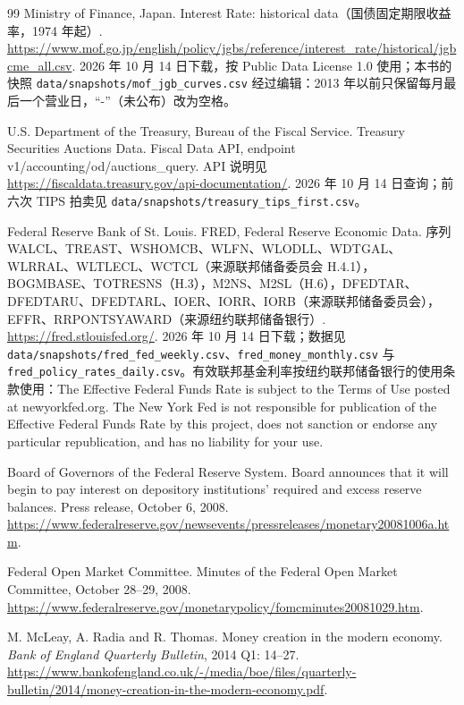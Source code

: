 \begin{thebibliography}{99}
 Ministry of Finance, Japan. Interest Rate: historical data（国债固定期限收益率，1974 年起）. \url{https://www.mof.go.jp/english/policy/jgbs/reference/interest_rate/historical/jgbcme_all.csv}. 2026 年 10 月 14 日下载，按 Public Data License 1.0 使用；本书的快照 \texttt{data/snapshots/mof\_jgb\_curves.csv} 经过编辑：2013 年以前只保留每月最后一个营业日，“-”（未公布）改为空格。

 U.S. Department of the Treasury, Bureau of the Fiscal Service. Treasury Securities Auctions Data. Fiscal Data API, endpoint v1/accounting/od/auctions\_query. API 说明见 \url{https://fiscaldata.treasury.gov/api-documentation/}. 2026 年 10 月 14 日查询；前六次 TIPS 拍卖见 \texttt{data/snapshots/treasury\_tips\_first.csv}。

 Federal Reserve Bank of St. Louis. FRED, Federal Reserve Economic Data. 序列 WALCL、TREAST、WSHOMCB、WLFN、WLODLL、WDTGAL、WLRRAL、WLTLECL、WCTCL（来源联邦储备委员会 H.4.1），BOGMBASE、TOTRESNS（H.3），M2NS、M2SL（H.6），DFEDTAR、DFEDTARU、DFEDTARL、IOER、IORR、IORB（来源联邦储备委员会），EFFR、RRPONTSYAWARD（来源纽约联邦储备银行）. \url{https://fred.stlouisfed.org/}. 2026 年 10 月 14 日下载；数据见 \texttt{data/snapshots/fred\_fed\_weekly.csv}、\texttt{fred\_money\_monthly.csv} 与 \texttt{fred\_policy\_rates\_daily.csv}。有效联邦基金利率按纽约联邦储备银行的使用条款使用：The Effective Federal Funds Rate is subject to the Terms of Use posted at newyorkfed.org. The New York Fed is not responsible for publication of the Effective Federal Funds Rate by this project, does not sanction or endorse any particular republication, and has no liability for your use.

 Board of Governors of the Federal Reserve System. Board announces that it will begin to pay interest on depository institutions' required and excess reserve balances. Press release, October 6, 2008. \url{https://www.federalreserve.gov/newsevents/pressreleases/monetary20081006a.htm}.

 Federal Open Market Committee. Minutes of the Federal Open Market Committee, October 28--29, 2008. \url{https://www.federalreserve.gov/monetarypolicy/fomcminutes20081029.htm}.

 M. McLeay, A. Radia and R. Thomas. Money creation in the modern economy. \emph{Bank of England Quarterly Bulletin}, 2014 Q1: 14--27. \url{https://www.bankofengland.co.uk/-/media/boe/files/quarterly-bulletin/2014/money-creation-in-the-modern-economy.pdf}.


\end{thebibliography}

